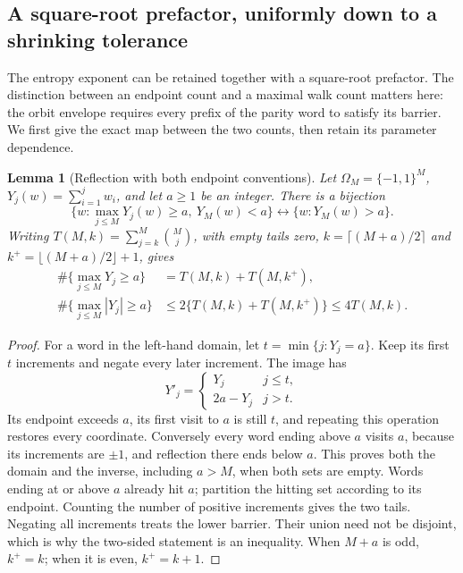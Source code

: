 \documentclass[11pt]{article}
\newtheorem{lemma}[proposition]{Lemma}
\theoremstyle{remark}\newtheorem{remark}[proposition]{Remark}
\begin{document}
\subsection{A square-root prefactor, uniformly down to a shrinking tolerance}
The entropy exponent can be retained together with a square-root
prefactor. The distinction between an endpoint count and a maximal
walk count matters here: the orbit envelope requires every prefix of
the parity word to satisfy its barrier. We first give the exact map
between the two counts, then retain its parameter dependence.

\begin{lemma}[Reflection with both endpoint conventions]
\label{lem:shaik-exact-reflection}
Let \(\Omega_M=\{-1,1\}^M\), \(Y_j(w)=\sum_{i=1}^j w_i\),
and let \(a\ge1\) be an integer. There is a bijection
\[
 \{w:\max_{j\le M}Y_j(w)\ge a,\ Y_M(w)<a\}
 \longleftrightarrow \{w:Y_M(w)>a\}.
\]
Writing \(T(M,k)=\sum_{j=k}^M\binom Mj\), with empty tails zero,
\(k=\lceil(M+a)/2\rceil\) and \(k^+=\lfloor(M+a)/2\rfloor+1\), gives
\begin{align}
 \#\{\max_{j\le M}Y_j\ge a\}&=T(M,k)+T(M,k^+),\nonumber\\
 \#\{\max_{j\le M}|Y_j|\ge a\}
 &\le2\{T(M,k)+T(M,k^+)\}\le4T(M,k).
 \label{eq:shaik-reflection-tail}
\end{align}
\end{lemma}
\begin{proof}
For a word in the left-hand domain, let
\(t=\min\{j:Y_j=a\}\). Keep its first \(t\) increments and negate
every later increment. The image has
\[
 Y'_j=\begin{cases}Y_j&j\le t,\\2a-Y_j&j>t.\end{cases}
\]
Its endpoint exceeds \(a\), its first visit to \(a\) is still \(t\),
and repeating this operation restores every coordinate. Conversely
every word ending above \(a\) visits \(a\), because its increments
are \(\pm1\), and reflection there ends below \(a\).
This proves both the domain and the inverse, including \(a>M\),
when both sets are empty. Words ending at or above \(a\) already
hit \(a\); partition the hitting set according to its endpoint.
Counting the number of positive increments gives the two tails.
Negating all increments treats the lower barrier. Their union need
not be disjoint, which is why the two-sided statement is an inequality.
When \(M+a\) is odd, \(k^+=k\); when it is even, \(k^+=k+1\).
\end{proof}
\end{document}
